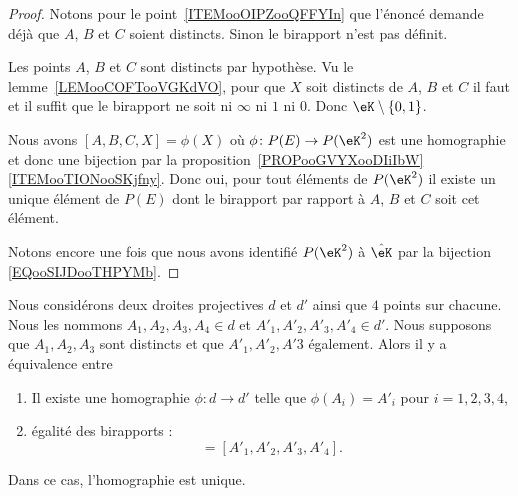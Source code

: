 \begin{proof}
	Notons pour le point~\ref{ITEMooOIPZooQFFYIn} que l'énoncé demande déjà que \( A\), \( B\) et \( C\) soient distincts. Sinon le birapport n'est pas définit.
	\begin{subproof}
		\spitem[\ref{ITEMooBEBEooVfiJXY}]

		Les points \( A\), \( B\) et \( C\) sont distincts par hypothèse. Vu le lemme~\ref{LEMooCOFTooVGKdVO}, pour que \( X\) soit distincts de \( A\), \( B\) et \( C\) il faut et il suffit que le birapport ne soit ni \( \infty\) ni \( 1\) ni \( 0\). Donc \( \eK\setminus\{ 0,1 \}\).

		\spitem[\ref{ITEMooBEBEooVfiJXY}]

		Nous avons \( [A,B,C,X]=\phi(X)\) où \( \phi\colon P(E)\to P(\eK^2)\) est une homographie et donc une bijection par la proposition~\ref{PROPooGVYXooDIiIbW}\ref{ITEMooTIONooSKjfny}. Donc oui, pour tout éléments de \( P(\eK^2)\) il existe un unique élément de \( P(E)\) dont le birapport par rapport à \( A\), \( B\) et \( C\) soit cet élément.

	\end{subproof}
	Notons encore une fois que nous avons identifié \( P(\eK^2)\) à \( \hat\eK\) par la bijection \eqref{EQooSIJDooTHPYMb}.
\end{proof}

\begin{proposition}      \label{PROPooMGYDooHqSoJs}
	Nous considérons deux droites projectives \( d\) et \( d'\) ainsi que \( 4\) points sur chacune. Nous les nommons \( A_1,A_2,A_3,A_4\in d\) et \( A'_1,A'_2,A'_3,A'_4\in d'\). Nous supposons que \( A_1,A_2,A_3\) sont distincts et que \( A'_1,A'_2,A'3\) également. Alors il y a équivalence entre
	\begin{enumerate}
		\item       \label{ITEMooIDKBooXHnNDi}
		      Il existe une homographie \( \phi\colon d\to d'\) telle que \( \phi(A_i)=A'_i\) pour \( i=1,2,3,4\),
		\item       \label{ITEMooCDWAooIckJwT}
		      égalité des birapports :
		      \begin{equation}
			      [A_1,A_2,A_3,A_4]=[A'_1,A'_2,A'_3,A'_4].
		      \end{equation}
	\end{enumerate}
	Dans ce cas, l'homographie est unique.
\end{proposition}

